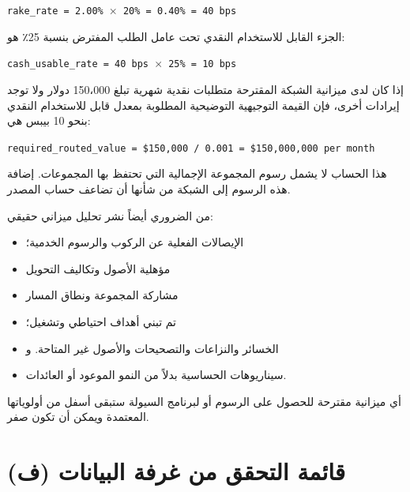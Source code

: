 \documentclass[11pt]{article}
\begin{document}
\texttt{rake\_rate = 2.00\% $\times$ 20\% = 0.40\% = 40 bps}

الجزء القابل للاستخدام النقدي تحت عامل الطلب المفترض بنسبة 25٪ هو:

\texttt{cash\_usable\_rate = 40 bps $\times$ 25\% = 10 bps}

إذا كان لدى ميزانية الشبكة المقترحة متطلبات نقدية شهرية تبلغ 150،000 دولار ولا توجد إيرادات أخرى، فإن القيمة التوجيهية التوضيحية المطلوبة بمعدل قابل للاستخدام النقدي بنحو 10 بيبس هي:

\texttt{required\_routed\_value = \$150,000 / 0.001 = \$150,000,000 per month}

هذا الحساب لا يشمل رسوم المجموعة الإجمالية التي تحتفظ بها المجموعات. إضافة هذه الرسوم إلى الشبكة من شأنها أن تضاعف حساب المصدر.

من الضروري أيضاً نشر تحليل ميزاني حقيقي:

\begin{itemize}[leftmargin=*]
\item الإيصالات الفعلية عن الركوب والرسوم الخدمية؛
\item مؤهلية الأصول وتكاليف التحويل
\item مشاركة المجموعة ونطاق المسار
\item تم تبني أهداف احتياطي وتشغيل؛
\item الخسائر والنزاعات والتصحيحات والأصول غير المتاحة. و
\item سيناريوهات الحساسية بدلاً من النمو الموعود أو العائدات.
\end{itemize}
أي ميزانية مقترحة للحصول على الرسوم أو لبرنامج السيولة ستبقى أسفل من أولوياتها المعتمدة ويمكن أن تكون صفر.


\section*{(ف) قائمة التحقق من غرفة البيانات}
\end{document}
